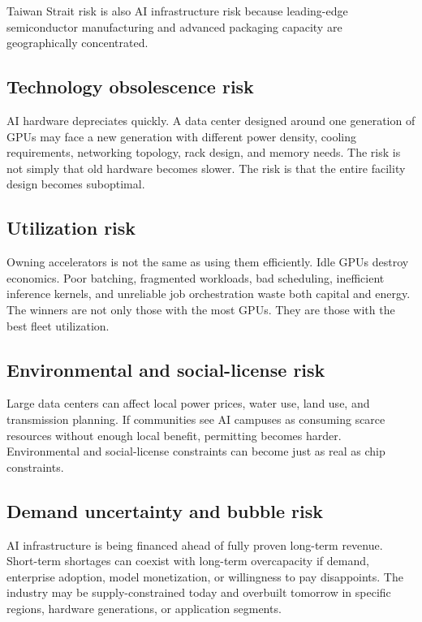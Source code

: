 Taiwan Strait risk is also AI infrastructure risk because leading-edge semiconductor manufacturing and advanced packaging capacity are geographically concentrated.

\subsection{Technology obsolescence risk}

AI hardware depreciates quickly. A data center designed around one generation of GPUs may face a new generation with different power density, cooling requirements, networking topology, rack design, and memory needs. The risk is not simply that old hardware becomes slower. The risk is that the entire facility design becomes suboptimal.

\subsection{Utilization risk}

Owning accelerators is not the same as using them efficiently. Idle GPUs destroy economics. Poor batching, fragmented workloads, bad scheduling, inefficient inference kernels, and unreliable job orchestration waste both capital and energy. The winners are not only those with the most GPUs. They are those with the best fleet utilization.

\subsection{Environmental and social-license risk}

Large data centers can affect local power prices, water use, land use, and transmission planning. If communities see AI campuses as consuming scarce resources without enough local benefit, permitting becomes harder. Environmental and social-license constraints can become just as real as chip constraints.

\subsection{Demand uncertainty and bubble risk}

AI infrastructure is being financed ahead of fully proven long-term revenue. Short-term shortages can coexist with long-term overcapacity if demand, enterprise adoption, model monetization, or willingness to pay disappoints. The industry may be supply-constrained today and overbuilt tomorrow in specific regions, hardware generations, or application segments.

